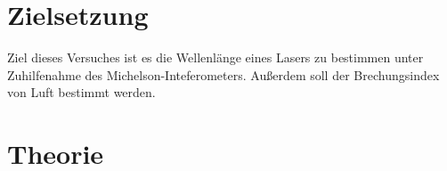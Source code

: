 \section{Zielsetzung}
\label{Zielsetzung}
Ziel dieses Versuches ist es die Wellenlänge eines Lasers zu bestimmen unter Zuhilfenahme des Michelson-Inteferometers.
Außerdem soll der Brechungsindex von Luft bestimmt werden.

\section{Theorie}
\label{sec:Theorie}


